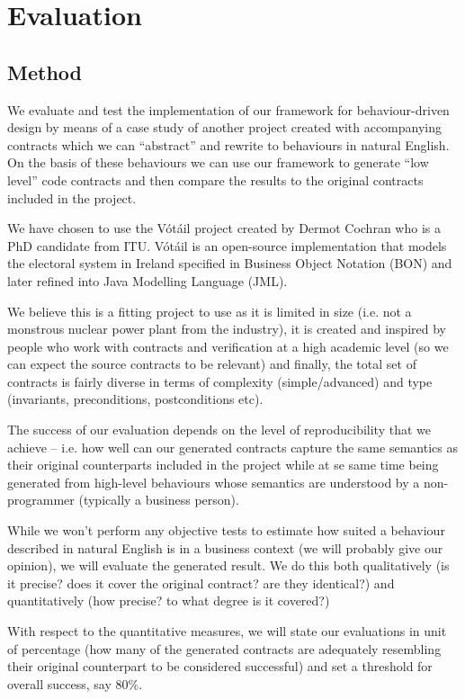 \section{Evaluation}
\subsection{Method}
\label{sub:Method}

We evaluate and test the implementation of our framework for behaviour-driven design by means of a case study of another project created with accompanying contracts which we can “abstract” and rewrite to behaviours in natural English. On the basis of these behaviours we can use our framework to generate “low level” code contracts and then compare the results to the original contracts included in the project.
 
We have chosen to use the Vótáil project created by Dermot Cochran who is a PhD candidate from ITU. Vótáil is an open-source implementation that models the electoral system in Ireland specified in Business Object Notation (BON) and later refined into Java Modelling Language (JML).
 
We believe this is a fitting project to use as it is limited in size (i.e. not a monstrous nuclear power plant from the industry), it is created and inspired by people who work with contracts and verification at a high academic level (so we can expect the source contracts to be relevant) and finally, the total set of contracts is fairly diverse in terms of complexity (simple/advanced) and type (invariants, preconditions, postconditions etc).
 
The success of our evaluation depends on the level of reproducibility that we achieve – i.e. how well can our generated contracts capture the same semantics as their original counterparts included in the project while at se same time being generated from high-level behaviours whose semantics are understood by a non-programmer (typically a business person).
 
While we won’t perform any objective tests to estimate how suited a behaviour described in natural English is in a business context (we will probably give our opinion), we will evaluate the generated result. We do this both qualitatively (is it precise? does it cover the original contract? are they identical?) and quantitatively (how precise? to what degree is it covered?)
 
With respect to the quantitative measures, we will state our evaluations in unit of percentage (how many of the generated contracts are adequately resembling their original counterpart to be considered successful) and set a threshold for overall success, say 80\%.

